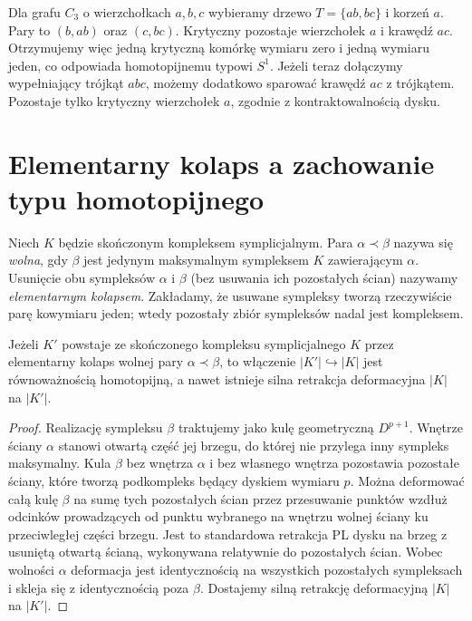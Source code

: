 \begin{przyklad}
Dla grafu $C_3$ o wierzchołkach $a,b,c$ wybieramy
drzewo $T=\{ab,bc\}$ i korzeń $a$.
Pary to $(b,ab)$ oraz $(c,bc)$. Krytyczny pozostaje
wierzchołek $a$ i krawędź $ac$. Otrzymujemy więc
jedną krytyczną komórkę wymiaru zero i jedną
wymiaru jeden, co odpowiada homotopijnemu typowi $S^1$.
Jeżeli teraz dołączymy wypełniający trójkąt $abc$,
możemy dodatkowo sparować krawędź $ac$ z trójkątem.
Pozostaje tylko krytyczny wierzchołek $a$, zgodnie
z kontraktowalnością dysku.
\end{przyklad}

\section{Elementarny kolaps a zachowanie typu homotopijnego}
\label{sec:tg-forman-collapse}

\begin{definicja}
Niech $K$ będzie skończonym kompleksem symplicjalnym.
Para $\alpha\prec\beta$ nazywa się \emph{wolna},
gdy $\beta$ jest jedynym maksymalnym sympleksem $K$
zawierającym $\alpha$. Usunięcie obu sympleksów
$\alpha$ i $\beta$ (bez usuwania ich pozostałych
ścian) nazywamy \emph{elementarnym kolapsem}.
Zakładamy, że usuwane sympleksy tworzą rzeczywiście
parę kowymiaru jeden; wtedy pozostały zbiór sympleksów
nadal jest kompleksem.
\end{definicja}

\begin{stwierdzenie}
Jeżeli $K'$ powstaje ze skończonego kompleksu
symplicjalnego $K$ przez elementarny kolaps wolnej
pary $\alpha\prec\beta$, to włączenie
$|K'|\hookrightarrow|K|$ jest równoważnością homotopijną,
a nawet istnieje silna retrakcja deformacyjna
$|K|$ na $|K'|$.
\end{stwierdzenie}

\begin{proof}
Realizację sympleksu $\beta$ traktujemy jako kulę
geometryczną $D^{p+1}$. Wnętrze ściany $\alpha$
stanowi otwartą część jej brzegu, do której nie
przylega inny sympleks maksymalny. Kula $\beta$
bez wnętrza $\alpha$ i bez własnego wnętrza
pozostawia pozostałe ściany, które tworzą podkompleks
będący dyskiem wymiaru $p$. Można deformować całą
kulę $\beta$ na sumę tych pozostałych ścian przez
przesuwanie punktów wzdłuż odcinków prowadzących
od punktu wybranego na wnętrzu wolnej ściany ku
przeciwległej części brzegu. Jest to standardowa
retrakcja PL dysku na brzeg z usuniętą otwartą ścianą,
wykonywana relatywnie do pozostałych ścian.
Wobec wolności $\alpha$ deformacja jest identycznością
na wszystkich pozostałych sympleksach i skleja się
z identycznością poza $\beta$. Dostajemy silną
retrakcję deformacyjną $|K|$ na $|K'|$.
\end{proof}

